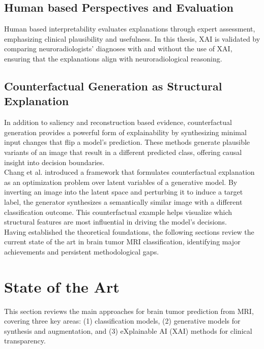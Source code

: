 \subsection{Human based Perspectives and Evaluation}

Human based interpretability evaluates explanations through expert assessment, emphasizing clinical plausibility and usefulness. In this thesis, XAI is validated by comparing neuroradiologists' diagnoses with and without the use of XAI, ensuring that the explanations align with neuroradiological reasoning.



\subsection{Counterfactual Generation as Structural Explanation}

In addition to saliency and reconstruction based evidence, counterfactual generation provides a powerful form of explainability by synthesizing minimal input changes that flip a model's prediction. These methods generate plausible variants of an image that result in a different predicted class, offering causal insight into decision boundaries.\\

Chang et al. \cite{chang2019explainingimageclassifierscounterfactual} introduced a framework that formulates counterfactual explanation as an optimization problem over latent variables of a generative model. By inverting an image into the latent space and perturbing it to induce a target label, the generator synthesizes a semantically similar image with a different classification outcome. This counterfactual example helps visualize which structural features are most influential in driving the model’s decisions.\\

Having established the theoretical foundations, the following sections review the current state of the art in brain tumor MRI classification, identifying major achievements and persistent methodological gaps.

\section{State of the Art}

This section reviews the main approaches for brain tumor prediction from MRI, covering three key areas: (1) classification models, (2) generative models for synthesis and augmentation, and (3) eXplainable AI (XAI) methods for clinical transparency.


